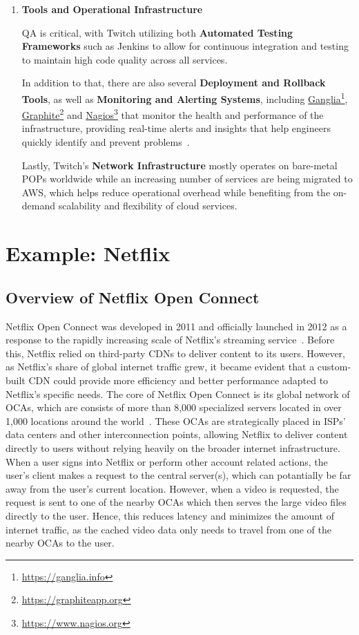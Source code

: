 \begin{enumerate}
    \item \textbf{Tools and Operational Infrastructure}

    \ac{QA} is critical, with Twitch utilizing both \textbf{Automated Testing Frameworks} such as Jenkins to allow for continuous integration and testing to maintain high code quality across all services.

    In addition to that, there are also several \textbf{Deployment and Rollback Tools}, as well as \textbf{Monitoring and Alerting Systems}, including \href{https://ganglia.info}{Ganglia}\footnote{\url{https://ganglia.info}}, \href{https://graphiteapp.org}{Graphite}\footnote{\url{https://graphiteapp.org}} and \href{https://www.nagios.org}{Nagios}\footnote{\url{https://www.nagios.org}} that monitor the health and performance of the infrastructure, providing real-time alerts and insights that help engineers quickly identify and prevent problems~\parencite{twitch_engineering}.

    Lastly, Twitch’s \textbf{Network Infrastructure} mostly operates on bare-metal \ac{POPs} worldwide while an increasing number of services are being migrated to \ac{AWS}, which helps reduce operational overhead while benefiting from the on-demand scalability and flexibility of cloud services.

\end{enumerate}

\section{Example: Netflix}


\subsection{Overview of Netflix Open Connect}

Netflix Open Connect was developed in 2011 and officially launched in 2012 as a response to the rapidly increasing scale of Netflix's streaming service~\parencite{netflix_functionality}. Before this, Netflix relied on third-party \ac{CDN}s to deliver content to its users. However, as Netflix's share of global internet traffic grew, it became evident that a custom-built \ac{CDN} could provide more efficiency and better performance adapted to Netflix's specific needs.
The core of Netflix Open Connect is its global network of \ac{OCAs}, which are consists of more than 8,000 specialized servers located in over 1,000 locations around the world~\parencite{netflix_open_connect}. These \ac{OCAs} are strategically placed in \ac{ISPs}' data centers and other interconnection points, allowing Netflix to deliver content directly to users without relying heavily on the broader internet infrastructure. 
When a user signs into Netflix or perform other account related actions, the user's client makes a request to the central server(s), which can potantially be far away from the user's current location. However, when a video is requested, the request is sent to one of the nearby \ac{OCAs} which then serves the large video files directly to the user. Hence, this reduces latency and minimizes the amount of internet traffic, as the cached video data only needs to travel from one of the nearby \ac{OCAs} to the user.

